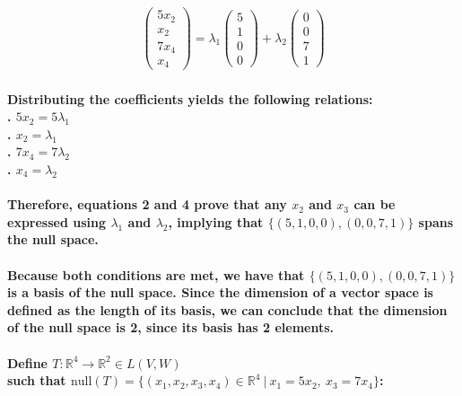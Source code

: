 \documentclass{article}
\begin{document}
\begin{align*}
\begin{pmatrix}
    5x_2 \\ x_2 \\ 7x_4 \\ x_4
\end{pmatrix}
= \lambda_1
\begin{pmatrix}
    5 \\ 1 \\ 0 \\ 0
\end{pmatrix}
+ \lambda_2
\begin{pmatrix}
    0 \\ 0 \\ 7 \\ 1
\end{pmatrix}
\end{align*}

\paragraph{\large
Distributing the coefficients yields the following relations:
\\. $5x_2 = 5\lambda_1$
\\. $x_2 = \lambda_1$
\\. $7x_4 = 7\lambda_2$
\\. $x_4 = \lambda_2$}

\paragraph{\large
Therefore, equations 2 and 4 prove that any $x_2$ and $x_3$ can be expressed using $\lambda_1$ and $\lambda_2$, implying that $\{(5, 1, 0, 0), (0, 0, 7, 1)\}$ spans the null space.}

\paragraph{\large
Because both conditions are met, we have that $\{(5, 1, 0, 0), (0, 0, 7, 1)\}$ is a basis of the null space. Since the dimension of a vector space is defined as the length of its basis, we can conclude that the dimension of the null space is 2, since its basis has 2 elements.}

\paragraph{\large
Define $T: \mathbb{R}^4 \rightarrow \mathbb{R}^2 \in L(V, W)$ \\such that $\mathrm{null}(T) = \{(x_1,x_2,x_3,x_4) \in \mathbb{R}^4 \ |\ x_1 = 5x_2,\ x_3 = 7x_4\}$:}
\end{document}
